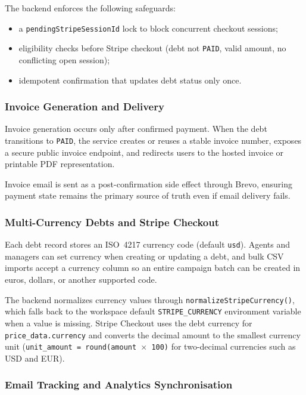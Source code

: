 \documentclass[12pt,a4paper]{report}
\begin{document}
The backend enforces the following safeguards:
\begin{itemize}
  \item a \texttt{pendingStripeSessionId} lock to block concurrent checkout sessions;
  \item eligibility checks before Stripe checkout (debt not \texttt{PAID}, valid
        amount, no conflicting open session);
  \item idempotent confirmation that updates debt status only once.
\end{itemize}

\subsubsection{Invoice Generation and Delivery}

Invoice generation occurs only after confirmed payment.
When the debt transitions to \texttt{PAID}, the service creates or reuses a stable
invoice number, exposes a secure public invoice endpoint, and redirects users to the
hosted invoice or printable PDF representation.

Invoice email is sent as a post-confirmation side effect through Brevo, ensuring
payment state remains the primary source of truth even if email delivery fails.

\subsubsection{Multi-Currency Debts and Stripe Checkout}

Each debt record stores an ISO~4217 currency code (default \texttt{usd}).
Agents and managers can set currency when creating or updating a debt, and bulk CSV
imports accept a currency column so an entire campaign batch can be created in euros,
dollars, or another supported code.

The backend normalizes currency values through \texttt{normalizeStripeCurrency()},
which falls back to the workspace default \texttt{STRIPE\_CURRENCY} environment
variable when a value is missing.
Stripe Checkout uses the debt currency for \texttt{price\_data.currency} and converts
the decimal amount to the smallest currency unit
(\texttt{unit\_amount = round(amount $\times$ 100)} for two-decimal currencies such
as USD and EUR).

\subsubsection{Email Tracking and Analytics Synchronisation}
\end{document}
